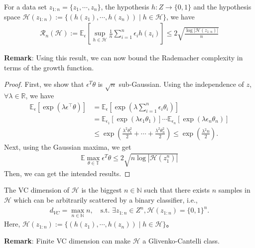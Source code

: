 \begin{theorem}
For a data set $z_{1:n} = \{z_1, \cdots, z_n\}$, the hypothesis $h: Z \rightarrow\{0,1\}$ and the hypothesis space $\mathcal{H}(z_{1:n}):=\{(h(z_1), \cdots, h(z_n)) \mid h \in \mathcal{H}\}$, we have
\begin{align*}
    {\mathcal{R}}_{n}\left(\mathcal{H}\right):=\mathbb{E}_{\epsilon}\left[ \sup _{h \in \mathcal{H}} \frac{1}{n} \sum_{i=1}^{n} \epsilon_{i} h\left(z_{i}\right)\right] \leq 2 \sqrt{\frac{\log \left|\mathcal{H}\left(z_{1:n}\right)\right|}{n}}
\end{align*}
\end{theorem}
\textbf{Remark}: Using this result, we can now bound the Rademacher complexity in terms of the growth function.

\vspace{1em}
\begin{proof}
First, we show that $\epsilon^T \theta$ is $\sqrt{n}$ sub-Gaussian. Using the independence of $z$, $\forall \lambda \in \mathbb{R}$, we have
\begin{align*}
\mathbb{E}_\epsilon \left[ \exp(\lambda \epsilon^\top\theta)\right] & = \mathbb{E}_\epsilon \left[\exp \left( \lambda \sum_{i=1}^n \epsilon_i \theta_i \right) \right] \\
& = \mathbb{E}_{\epsilon_1} \left[\exp \left(\lambda\epsilon_1 \theta_1 \right) \right] \cdots \mathbb{E}_{\epsilon_n} \left[\exp \left(\lambda \epsilon_n \theta_n \right) \right]\\
& \leq \exp\left(\frac{\lambda^2 \theta_1^2}{2} + \cdots + \frac{\lambda^2 \theta_n^2}{2} \right) \leq \exp\left(\frac{\lambda^2 n}{2}\right).
\end{align*}
Next, using the Gaussian maxima, we get
\begin{align*}
    \mathbb{E} \max _{\theta \in \mathbb{T}} \epsilon^T \theta \leq 2 \sqrt{n \log \left|\mathcal{H}\left(z_{1}^{n}\right)\right|}
\end{align*}
Then, we can get the intended results.
\end{proof}

\begin{definition}[VC Dimension]
The VC dimension of $\mathcal{H}$ is  the biggest $n \in \mathbb{N}$ such that there exists $n$ samples in $\mathcal{H}$ which can be arbitrarily scattered by a binary classifier, i.e.,
\begin{align*}
    d_{VC} = \max_{n \in \mathbb{N}} n, \quad \text{s.t. } \exists z_{1:n} \in Z^n, \mathcal{H}(z_{1:n}) = \{0,1\}^n.
\end{align*}
Here, $\mathcal{H}(z_{1:n}):=\{(h(z_1), \cdots, h(z_n)) \mid h \in \mathcal{H}\}$。
\end{definition}
\textbf{Remark}: Finite VC dimension can make $\mathcal{H}$ a Glivenko-Cantelli class.

